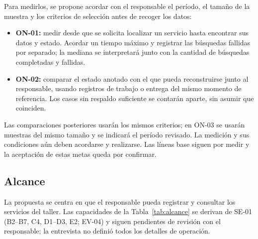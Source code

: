 Para medirlos, se propone acordar con el responsable el período, el tamaño de la muestra y los
criterios de selección antes de recoger los datos:
\begin{itemize}[nosep]
  \item \textbf{ON-01:} medir desde que se solicita localizar un servicio hasta encontrar sus
        datos y estado. Acordar un tiempo máximo y registrar las búsquedas fallidas por separado;
        la mediana se interpretará junto con la cantidad de búsquedas completadas y fallidas.
  \item \textbf{ON-02:} comparar el estado anotado con el que pueda reconstruirse junto al
        responsable, usando registros de trabajo o entrega del mismo momento de referencia.
        Los casos sin respaldo suficiente se contarán aparte, sin asumir que coinciden.
\end{itemize}
Las comparaciones posteriores usarán los mismos criterios; en ON-03 se usarán muestras del mismo
tamaño y se indicará el período revisado. La medición y sus condiciones aún deben acordarse y
realizarse. Las líneas base siguen por medir y la aceptación de estas metas queda por confirmar.

\subsection{Alcance}
La propuesta se centra en que el responsable pueda registrar y consultar los servicios del taller.
Las capacidades de la Tabla~\ref{tab:alcance} se derivan de SE-01 (B2--B7, C4, D1--D3, E2;
EV-04) y siguen pendientes de revisi\'on con el responsable; la entrevista no defini\'o todos los
detalles de operaci\'on.

